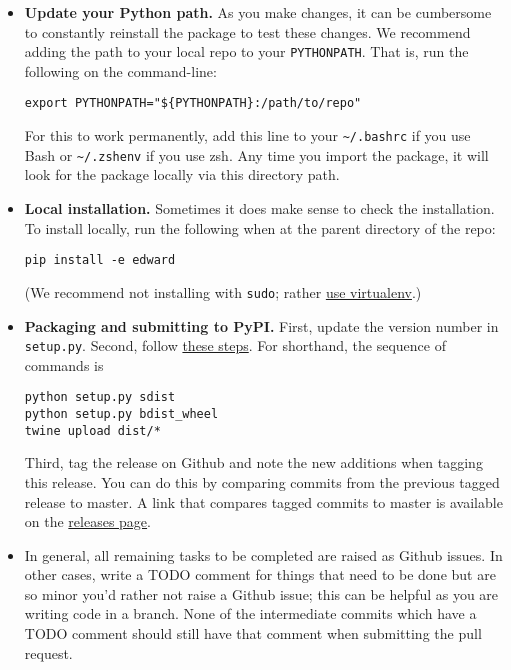 \begin{itemize}
\item
  \textbf{Update your Python path.} As you make changes, it can be
  cumbersome to constantly reinstall the package to test these changes.
  We recommend adding the path to your local repo to your
  \texttt{PYTHONPATH}. That is, run the following on the command-line:

\begin{lstlisting}[class=JSON]
export PYTHONPATH="${PYTHONPATH}:/path/to/repo"
\end{lstlisting}

  For this to work permanently, add this line to your
  \texttt{\textasciitilde{}/.bashrc} if you use Bash or
  \texttt{\textasciitilde{}/.zshenv} if you use zsh. Any time you import
  the package, it will look for the package locally via this directory
  path.
\item
  \textbf{Local installation.} Sometimes it does make sense to check the
  installation. To install locally, run the following when at the parent
  directory of the repo:

\begin{verbatim}
pip install -e edward
\end{verbatim}

  (We recommend not installing with \texttt{sudo}; rather
  \href{http://docs.python-guide.org/en/latest/starting/install/osx/}{use
  virtualenv}.)
\item
  \textbf{Packaging and submitting to PyPI.} First, update the version
  number in \texttt{setup.py}. Second, follow
  \href{https://packaging.python.org/en/latest/distributing/\#packaging-your-project}{these
  steps}. For shorthand, the sequence of commands is

\begin{lstlisting}[class=JSON]
python setup.py sdist
python setup.py bdist_wheel
twine upload dist/*
\end{lstlisting}

  Third, tag the release on Github and note the new additions when
  tagging this release. You can do this by comparing commits from the
  previous tagged release to master. A link that compares tagged commits
  to master is available on the
  \href{https://github.com/blei-lab/edward/releases}{releases page}.
\item
  In general, all remaining tasks to be completed are raised as Github
  issues. In other cases, write a TODO comment for things that need to
  be done but are so minor you'd rather not raise a Github issue; this
  can be helpful as you are writing code in a branch. None of the
  intermediate commits which have a TODO comment should still have
  that comment when submitting the pull request.
\end{itemize}

